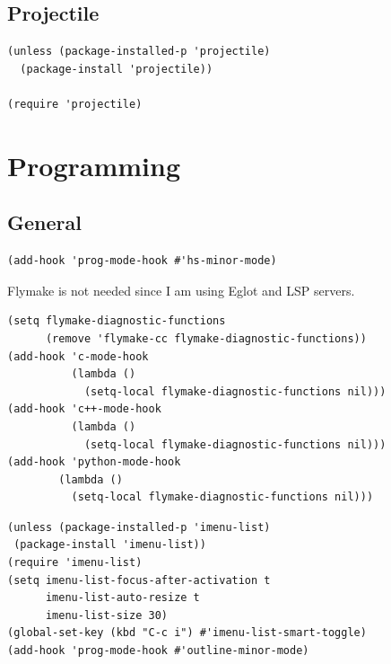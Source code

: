 \documentclass[11pt]{article}
\begin{document}
\subsection{Projectile}
\label{sec:orga98df30}
\begin{verbatim}
(unless (package-installed-p 'projectile)
  (package-install 'projectile))

(require 'projectile)
\end{verbatim}
\section{Programming}
\label{sec:orge4748c8}
\subsection{General}
\label{sec:org7802dbd}
\begin{verbatim}
(add-hook 'prog-mode-hook #'hs-minor-mode)
\end{verbatim}

Flymake is not needed since I am using Eglot and LSP servers.
\begin{verbatim}
(setq flymake-diagnostic-functions
      (remove 'flymake-cc flymake-diagnostic-functions))
(add-hook 'c-mode-hook
          (lambda ()
            (setq-local flymake-diagnostic-functions nil)))
(add-hook 'c++-mode-hook
          (lambda ()
            (setq-local flymake-diagnostic-functions nil)))
(add-hook 'python-mode-hook
        (lambda ()
          (setq-local flymake-diagnostic-functions nil)))
\end{verbatim}

\begin{verbatim}
(unless (package-installed-p 'imenu-list)
 (package-install 'imenu-list))
(require 'imenu-list)
(setq imenu-list-focus-after-activation t
      imenu-list-auto-resize t
      imenu-list-size 30)
(global-set-key (kbd "C-c i") #'imenu-list-smart-toggle)
(add-hook 'prog-mode-hook #'outline-minor-mode)
\end{verbatim}
\end{document}
